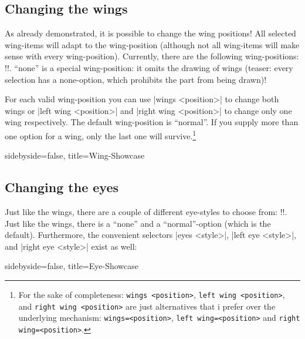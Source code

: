 \documentclass[parskip=half,english,noenddot,numbers=noenddot,footnotes=nomultiple,oneside]{scrartcl}
\makeatletter
\let\say\enquote
\def\DTLlistformatitem#1{\textit{#1}}
\newcommand*\typesetselection[1][]{\begingroup\ifx!#1!\else\def\DTLlistformatitem##1{#1}\fi\dotypesetselection}
\def\dotypesetselection#1{\expandafter\DTLformatlist\expandafter{\csname @pingu@#1@\endcsname}\endgroup}
\def\ipingu#1{\lstinline'#1'}
\makeatother
\begin{document}
\subsection{Changing the wings}
\label{subsec:wings}As already demonstrated, it is possible to change the wing positions!
All selected wing-items will adapt to the wing-position (although not all wing-items will make sense with every wing-position).
Currently, there are the following wing-positions:
\typesetselection{leftwing}. \say{none} is a special wing-position: it omits the drawing of wings (teaser: every selection has a none-option, which prohibits the part from being drawn)!

For each valid wing-position you can use |wings <position>| to change both wings or |left wing <position>| and |right wing <position>| to change only one wing respectively. The default wing-position is \say{normal}. If you supply more than one option for a wing, only the last one will survive.\footnote{For the sake of completeness: \ipingu{wings <position>}, \ipingu{left wing <position>}, and \ipingu{right wing <position>} are just alternatives that i prefer over the underlying mechanism: \ipingu{wings=<position>}, \ipingu{left wing=<position>} and \ipingu{right wing=<position>}.}
\begin{tcblisting}{sidebyside=false, title=Wing-Showcase}
\begin{tikzpicture}
	\pingu[left wing none, heart=green]
	\pingu[wings wave, heart=teal, xshift=3.5cm]
	\pingu[wings hug, heart=orange, xshift=7cm]
	\pingu[left wing grab, right wing shock, heart=purple,  xshift=10.5cm]
\end{tikzpicture}
\end{tcblisting}

\subsection{Changing the eyes}
\label{mrk:pengu-eye}Just like the wings, there are a couple of different eye-styles to choose from: \typesetselection{lefteye}. Just like the wings, there is a \say{none} and a \say{normal}-option (which is the default).
Furthermore, the convenient selectors |eyes <style>|, |left eye <style>|, and |right eye <style>| exist as well:
\begin{tcblisting}{sidebyside=false, title=Eye-Showcase}
\begin{tikzpicture}
	\pingu[left eye none, heart=green]
	\pingu[eyes wink, heart=teal, xshift=3.5cm]
	\pingu[eyes shock, heart=orange, xshift=7cm]
	\pingu[left eye devil, right eye angry, heart=purple,  xshift=10.5cm]
\end{tikzpicture}
\end{tcblisting}
\end{document}
